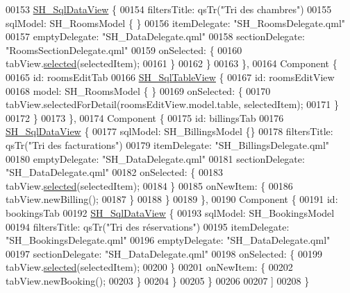 \begin{DoxyCode}
00153             \hyperlink{classSH__SqlDataView}{SH\_SqlDataView} \{
00154                 filtersTitle: qsTr(\textcolor{stringliteral}{"Tri des chambres"})
00155                 sqlModel: SH\_RoomsModel \{ \}
00156                 itemDelegate: \textcolor{stringliteral}{"SH\_RoomsDelegate.qml"}
00157                 emptyDelegate: \textcolor{stringliteral}{"SH\_DataDelegate.qml"}
00158                 sectionDelegate: \textcolor{stringliteral}{"RoomsSectionDelegate.qml"}
00159                 onSelected: \{
00160                     tabView.\hyperlink{classSH__SqlDataView_a95366e3f65b183e8c82381e90b5ddc94}{selected}(selectedItem);
00161                 \}
00162             \}
00163         \},
00164         Component \{
00165             \textcolor{keywordtype}{id}: roomsEditTab
00166             \hyperlink{classSH__SqlTableView}{SH\_SqlTableView} \{
00167                 \textcolor{keywordtype}{id}: roomsEditView
00168                 model: SH\_RoomsModel \{ \}
00169                 onSelected: \{
00170                     tabView.selectedForDetail(roomsEditView.model.table, selectedItem);
00171                 \}
00172             \}
00173         \},
00174         Component \{
00175             \textcolor{keywordtype}{id}: billingsTab
00176             \hyperlink{classSH__SqlDataView}{SH\_SqlDataView} \{
00177                 sqlModel: SH\_BillingsModel \{\}
00178                 filtersTitle: qsTr(\textcolor{stringliteral}{"Tri des facturations"})
00179                 itemDelegate: \textcolor{stringliteral}{"SH\_BillingsDelegate.qml"}
00180                 emptyDelegate: \textcolor{stringliteral}{"SH\_DataDelegate.qml"}
00181                 sectionDelegate: \textcolor{stringliteral}{"SH\_DataDelegate.qml"}
00182                 onSelected: \{
00183                     tabView.\hyperlink{classSH__SqlDataView_a95366e3f65b183e8c82381e90b5ddc94}{selected}(selectedItem);
00184                 \}
00185                 onNewItem: \{
00186                     tabView.newBilling();
00187                 \}
00188             \}
00189         \},
00190         Component \{
00191             \textcolor{keywordtype}{id}: bookingsTab
00192             \hyperlink{classSH__SqlDataView}{SH\_SqlDataView} \{
00193                 sqlModel: SH\_BookingsModel
00194                 filtersTitle: qsTr(\textcolor{stringliteral}{"Tri des réservations"})
00195                 itemDelegate: \textcolor{stringliteral}{"SH\_BookingsDelegate.qml"}
00196                 emptyDelegate: \textcolor{stringliteral}{"SH\_DataDelegate.qml"}
00197                 sectionDelegate: \textcolor{stringliteral}{"SH\_DataDelegate.qml"}
00198                 onSelected: \{
00199                     tabView.\hyperlink{classSH__SqlDataView_a95366e3f65b183e8c82381e90b5ddc94}{selected}(selectedItem);
00200                 \}
00201                 onNewItem: \{
00202                     tabView.newBooking();
00203                 \}
00204             \}
00205         \}
00206 
00207     ]
00208 \}
\end{DoxyCode}
